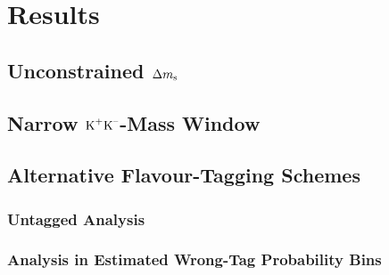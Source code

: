 \chapter{Results}
\label{chap:result}


\clearpage

\section{Unconstrained \texorpdfstring{$\Delta m_\text{s}$}{Deltams}}
\section{Narrow \texorpdfstring{$\text{K}^\text{+}\text{K}^\text{--}$}{KK}-Mass Window}
\section{Alternative Flavour-Tagging Schemes}
\subsection{Untagged Analysis}
\subsection{Analysis in Estimated Wrong-Tag Probability Bins}
